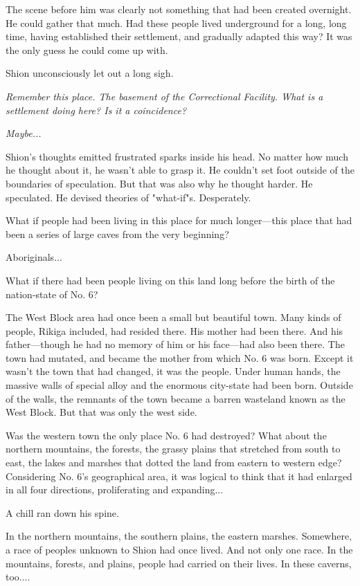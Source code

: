 The scene before him was clearly not something that had been created
overnight. He could gather that much. Had these people lived underground
for a long, long time, having established their settlement, and
gradually adapted this way? It was the only guess he could come up with.

Shion unconsciously let out a long sigh.

\emph{Remember this place. The basement of the Correctional Facility. What is
a settlement doing here? Is it a coincidence?}

\emph{Maybe...}

Shion's thoughts emitted frustrated sparks inside his head. No matter
how much he thought about it, he wasn't able to grasp it. He couldn't
set foot outside of the boundaries of speculation. But that was also why
he thought harder. He speculated. He devised theories of "what-if"s.
Desperately.

What if people had been living in this place for much longer---this place
that had been a series of large caves from the very beginning?

Aboriginals...

What if there had been people living on this land long before the birth
of the nation-state of No. 6?

The West Block area had once been a small but beautiful town. Many kinds
of people, Rikiga included, had resided there. His mother had been
there. And his father---though he had no memory of him or his face---had
also been there. The town had mutated, and became the mother from which
No. 6 was born. Except it wasn't the town that had changed, it was the
people. Under human hands, the massive walls of special alloy and the
enormous city-state had been born. Outside of the walls, the remnants of
the town became a barren wasteland known as the West Block. But that was
only the west side.

Was the western town the only place No. 6 had destroyed? What about the
northern mountains, the forests, the grassy plains that stretched from
south to east, the lakes and marshes that dotted the land from eastern
to western edge? Considering No. 6's geographical area, it was logical
to think that it had enlarged in all four directions, proliferating and
expanding...

A chill ran down his spine.

In the northern mountains, the southern plains, the eastern marshes.
Somewhere, a race of peoples unknown to Shion had once lived. And not
only one race. In the mountains, forests, and plains, people had carried
on their lives. In these caverns, too....

